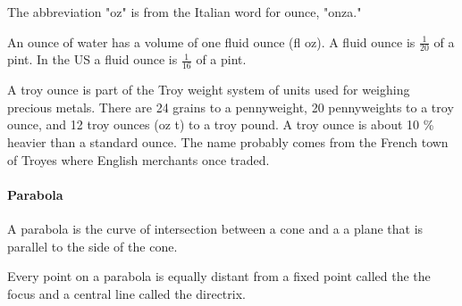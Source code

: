 \documentclass[12pt]{article}
\begin{document}
{The abbreviation "oz" is from the Italian word for ounce, "onza."

An ounce of water has a volume of one fluid ounce (fl oz). A fluid ounce is $\frac{1}{20}$ of a pint.
In the US a fluid ounce is $\frac{1}{16}$ of a pint.
  
A troy ounce is part of the Troy weight system of units used for weighing precious metals. There are 24 grains to a pennyweight, 20 pennyweights to a troy ounce, and 12 troy ounces (oz t) to a troy pound. A troy ounce is about 10 \% heavier than a standard ounce. The name probably comes from the French town of Troyes where English merchants once traded.

\paragraph{Parabola}
A parabola is the curve of intersection between a cone and a a plane that is parallel to the side of the cone.

\begin{center}
\end{center}

Every point on a parabola is equally distant from a fixed point called the the focus and a central line called the directrix.

\begin{center}
\end{center}

}
\end{document}
